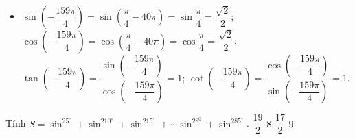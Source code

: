 \begin{bt}
{\begin{itemize}
			$\cos \dfrac{19\pi}{2}=\cos \left(10\pi-\dfrac{\pi}{2}\right)=\cos \left(-\dfrac{\pi}{2}\right)=\cos \dfrac{\pi}{2}=0$;
			$\cot \dfrac{19\pi}{2}=\dfrac{\cos \dfrac{19\pi}{2}}{\sin \dfrac{19\pi}{2}}=0$.
			\item $\sin \left(-\dfrac{159\pi}{4}\right)=\sin \left(\dfrac{\pi}{4}-40\pi\right)=\sin \dfrac{\pi}{4}=\dfrac{\sqrt{2}}{2}$;\\
			$\cos \left(-\dfrac{159\pi}{4}\right)=\cos \left(\dfrac{\pi}{4}-40\pi\right)=\cos \dfrac{\pi}{4}=\dfrac{\sqrt{2}}{2}$;\\
			$\tan \left(-\dfrac{159\pi}{4}\right)=\dfrac{\sin \left(-\dfrac{159\pi}{4}\right)}{\cos \left(-\dfrac{159\pi}{4}\right)}=1$;
			$\cot \left(-\dfrac{159\pi}{4}\right)=\dfrac{\cos \left(-\dfrac{159\pi}{4}\right)}{\sin \left(-\dfrac{159\pi}{4}\right)}=1$.
		\end{itemize}
	}
\end{bt}

\begin{ex}%
	Tính $S=\sin ^25^{\circ}+\sin ^210^{\circ}+\sin  ^215^{\circ}+\cdots\sin ^28^0+\sin ^285^{\circ}$.
	 \choice
		{$\dfrac{19}{2}$} 
		{$8$} 
		 {\True $\dfrac{17}{2}$}
		{$9$} 
\end{ex}

